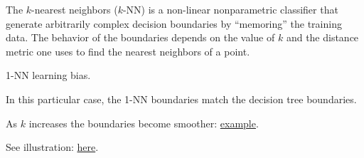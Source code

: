 The $k$-nearest neighbors ($k$-NN) is a non-linear nonparametric classifier that
generate arbitrarily complex decision boundaries by ``memoring'' the training data.
The behavior of the boundaries depends on the value of $k$ and the distance metric one
uses to find the nearest neighbors of a point.

\begin{figurebox}[label=fig:1nn-bias]{1-NN learning bias.}
  \centering
  \tcblower
  In this particular case, the 1-NN boundaries match the decision tree boundaries.
\end{figurebox}

As $k$ increases the boundaries become smoother:
\href{https://images.squarespace-cdn.com/content/v1/5d782753c70af105c29a9b14/1580261947016-XODPUVKWPGGMJJMAXSNF/Screen+Shot+2020-01-28+at+8.38.55+PM.png}{example}.

See illustration: \href{https://scikit-learn.org/stable/auto_examples/classification/plot_classifier_comparison.html}{here}.

